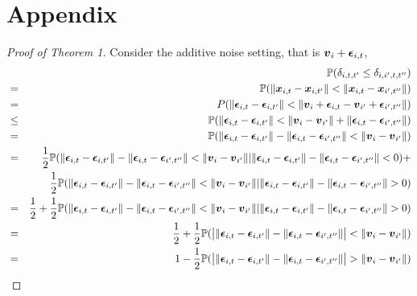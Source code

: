 \documentclass{article}
\begin{document}
\section{Appendix}


% 
% 
% 
% 
% 
% 
% 
% 



\appendix
\begin{proof}[Proof of Theorem 1]
	Consider the additive noise setting, that is $\boldsymbol{v}_{i} + \boldsymbol{\epsilon}_{i,t}$,  
	\begin{eqnarray*}
		& &\PP(\delta_{i,t,t'} \leq \delta_{i,i',t,t''}) \\
		&=&\PP(\|\bx_{i,t}-\bx_{i,t'}\|<\|\bx_{i,t}-\bx_{i',t''}\|) \\
		&=&P(\|\mb{\epsilon}_{i,t}-\mb{\epsilon}_{i,t'}\| < \|\bv_{i}+\mb{\epsilon}_{i,t}-\bv_{i'}+\mb{\epsilon}_{i',t''}\|) \\
		&\leq&\PP(\|\mb{\epsilon}_{i,t}-\mb{\epsilon}_{i,t'}\| < \|\bv_{i}-\bv_{i'}\| + \|\mb{\epsilon}_{i,t}-\mb{\epsilon}_{i',t''}\|) \\
		&=& \PP(\|\mb{\epsilon}_{i,t}-\mb{\epsilon}_{i,t'}\|-\|\mb{\epsilon}_{i,t}-\mb{\epsilon}_{i',t''}\|< \|\bv_{i}-\bv_{i'}\|) \\
		&=& \frac{1}{2}\PP(\|\mb{\epsilon}_{i,t}-\mb{\epsilon}_{i,t'}\|-\|\mb{\epsilon}_{i,t}-\mb{\epsilon}_{i',t''}\|< \|\bv_{i}-\bv_{i'}\||\|\mb{\epsilon}_{i,t}-\mb{\epsilon}_{i,t'}\|-\|\mb{\epsilon}_{i,t}-\mb{\epsilon}_{i',t''}\|<0) + \\ 
		& &\frac{1}{2}\PP(\|\mb{\epsilon}_{i,t}-\mb{\epsilon}_{i,t'}\|-\|\mb{\epsilon}_{i,t}-\mb{\epsilon}_{i',t''}\|< \|\bv_{i}-\bv_{i'}\||\|\mb{\epsilon}_{i,t}-\mb{\epsilon}_{i,t'}\|-\|\mb{\epsilon}_{i,t}-\mb{\epsilon}_{i',t''}\|>0) \\
		&=&\frac{1}{2} + \frac{1}{2}\PP(\|\mb{\epsilon}_{i,t}-\mb{\epsilon}_{i,t'}\|-\|\mb{\epsilon}_{i,t}-\mb{\epsilon}_{i',t''}\|< \|\bv_{i}-\bv_{i'}\||\|\mb{\epsilon}_{i,t}-\mb{\epsilon}_{i,t'}\|-\|\mb{\epsilon}_{i,t}-\mb{\epsilon}_{i',t''}\|>0) \\
		&=& \frac{1}{2} + \frac{1}{2}\PP(\big| \|\mb{\epsilon}_{i,t}-\mb{\epsilon}_{i,t'}\|-\|\mb{\epsilon}_{i,t}-\mb{\epsilon}_{i',t''}\| \big|< \|\bv_{i}-\bv_{i'}\|)\\
		&=& 1 - \frac{1}{2} \PP(\big| \|\mb{\epsilon}_{i,t}-\mb{\epsilon}_{i,t'}\|-\|\mb{\epsilon}_{i,t}-\mb{\epsilon}_{i',t''}\| \big|> \|\bv_{i}-\bv_{i'}\|)\\
	\end{eqnarray*}

\end{proof}
\end{document}
